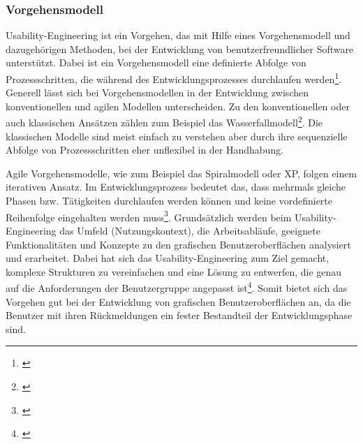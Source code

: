\subsubsection{Vorgehensmodell}
\label{sec:vorgehensmodellUsabilityEngineering}
Usability-Engineering ist ein Vorgehen, das mit Hilfe eines Vorgehensmodell und dazugehörigen Methoden, bei der Entwicklung von benutzerfreundlicher Software unterstützt. Dabei ist ein Vorgehensmodell eine definierte Abfolge von Prozessschritten, die während des Entwicklungsprozesses durchlaufen werden\footnote{\cite[vgl.][7]{Richter2013}}. Generell lässt sich bei Vorgehensmodellen in der Entwicklung zwischen konventionellen und agilen Modellen unterscheiden. Zu den konventionellen oder auch klassischen Ansätzen zählen zum Beispiel das Wasserfallmodell\footnote{\cite[vgl.][27\psqq]{Brandt2008}}. Die klassischen Modelle sind meist einfach zu verstehen aber durch ihre sequenzielle Abfolge von Prozessschritten eher unflexibel in der Handhabung.

Agile Vorgehensmodelle, wie zum Beispiel das Spiralmodell oder \gls{XP}, folgen einem iterativen Ansatz. Im Entwicklungsprozess bedeutet das, dass mehrmals gleiche Phasen bzw. Tätigkeiten durchlaufen werden können und keine vordefinierte Reihenfolge eingehalten werden muss\footnote{\cite[vgl.][29\psqq]{Brandt2008}}. Grundsätzlich werden beim Usability-Engineering das Umfeld (Nutzungskontext), die Arbeitsabläufe, geeignete Funktionalitäten und Konzepte zu den grafischen Benutzeroberflächen analysiert und erarbeitet. Dabei hat sich das Usability-Engineering zum Ziel gemacht, komplexe Strukturen zu vereinfachen und eine Lösung zu entwerfen, die genau auf die Anforderungen der Benutzergruppe angepasst ist\footnote{\cite[vgl.][7]{Richter2013}}. Somit bietet sich das Vorgehen gut bei der Entwicklung von grafischen Benutzeroberflächen an, da die Benutzer mit ihren Rückmeldungen ein fester Bestandteil der Entwicklungsphase sind.

